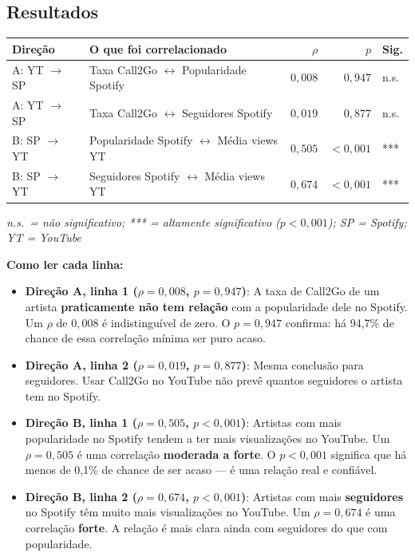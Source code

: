 \documentclass[12pt,a4paper]{article}
\begin{document}
\subsection{Resultados}

\medskip
\begin{center}
\begin{tabular}{llrrl}
\toprule
\textbf{Direção} & \textbf{O que foi correlacionado} & $\rho$ & $p$ &
  \textbf{Sig.} \\
\midrule
A: YT $\to$ SP & Taxa Call2Go $\leftrightarrow$ Popularidade Spotify
  & $0{,}008$ & $0{,}947$ & n.s. \\
A: YT $\to$ SP & Taxa Call2Go $\leftrightarrow$ Seguidores Spotify
  & $0{,}019$ & $0{,}877$ & n.s. \\
\midrule
B: SP $\to$ YT & Popularidade Spotify $\leftrightarrow$ Média views YT
  & $0{,}505$ & $<0{,}001$ & *** \\
B: SP $\to$ YT & Seguidores Spotify $\leftrightarrow$ Média views YT
  & $0{,}674$ & $<0{,}001$ & *** \\
\bottomrule
\end{tabular}
\end{center}
\medskip
\small\textit{n.s.\ = não significativo; *** = altamente significativo ($p <
0{,}001$); SP = Spotify; YT = YouTube}\normalsize

\bigskip
\textbf{Como ler cada linha:}

\begin{itemize}
  \item \textbf{Direção A, linha 1 ($\rho = 0{,}008$, $p = 0{,}947$)}: A taxa
        de Call2Go de um artista \textbf{praticamente não tem relação} com a
        popularidade dele no Spotify. Um $\rho$ de $0{,}008$ é
        indistinguível de zero. O $p = 0{,}947$ confirma: há 94,7\% de chance
        de essa correlação mínima ser puro acaso.

  \item \textbf{Direção A, linha 2 ($\rho = 0{,}019$, $p = 0{,}877$)}:
        Mesma conclusão para seguidores. Usar Call2Go no YouTube não prevê
        quantos seguidores o artista tem no Spotify.

  \item \textbf{Direção B, linha 1 ($\rho = 0{,}505$, $p < 0{,}001$)}:
        Artistas com mais popularidade no Spotify tendem a ter mais
        visualizações no YouTube. Um $\rho = 0{,}505$ é uma correlação
        \textbf{moderada a forte}. O $p < 0{,}001$ significa que há menos
        de 0,1\% de chance de ser acaso --- é uma relação real e confiável.

  \item \textbf{Direção B, linha 2 ($\rho = 0{,}674$, $p < 0{,}001$)}:
        Artistas com mais \textbf{seguidores} no Spotify têm muito mais
        visualizações no YouTube. Um $\rho = 0{,}674$ é uma correlação
        \textbf{forte}. A relação é mais clara ainda com seguidores do que com
        popularidade.
\end{itemize}
\end{document}
